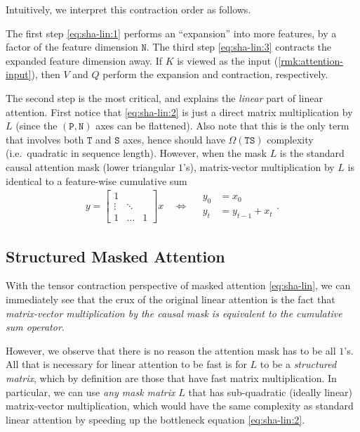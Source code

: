 \documentclass{article}
\begin{document}
Intuitively, we interpret this contraction order as follows.

The first step \eqref{eq:sha-lin:1} performs an ``expansion'' into more features, by a factor of the feature dimension $\mathtt{N}$.
The third step \eqref{eq:sha-lin:3} contracts the expanded feature dimension away.
If $K$ is viewed as the input (\cref{rmk:attention-input}),
then $V$ and $Q$ perform the expansion and contraction, respectively.

The second step is the most critical, and explains the \emph{linear} part of linear attention.
First notice that \eqref{eq:sha-lin:2} is just a direct matrix multiplication by $L$ (since the $\mathtt{(P,N)}$ axes can be flattened).
Also note that this is the only term that involves both $\mathtt{T}$ and $\mathtt{S}$ axes,
hence should have $\Omega(\mathtt{TS})$ complexity (i.e.\ quadratic in sequence length).
However, when the mask $L$ is the standard causal attention mask (lower triangular $1$'s),
matrix-vector multiplication by $L$ is identical to a feature-wise cumulative sum
\begin{align*}
  y = \begin{bmatrix} 1 \\ \vdots & \ddots \\ 1 & \dots & 1 \end{bmatrix} x
  \quad\iff\quad
  \begin{aligned}
    y_0 &= x_0 \\
    y_t &= y_{t-1} + x_t
  \end{aligned}
  .
\end{align*}

\subsection{Structured Masked Attention}
\label{sec:structured-attention}

With the tensor contraction perspective of masked attention \eqref{eq:sha-lin},
we can immediately see that the crux of the original linear attention is the fact that \emph{matrix-vector multiplication by the causal mask is equivalent to the cumulative sum operator}.

However, we observe that there is no reason the attention mask has to be all $1$'s.
All that is necessary for linear attention to be fast is for $L$ to be a \emph{structured matrix},
which by definition are those that have fast matrix multiplication\iftoggle{arxiv}{ (\cref{sec:overview:structured-matrix})}{}.
In particular, we can use \emph{any mask matrix} $L$ that has sub-quadratic (ideally linear) matrix-vector multiplication,
which would have the same complexity as standard linear attention by speeding up the bottleneck equation \eqref{eq:sha-lin:2}.
\end{document}
